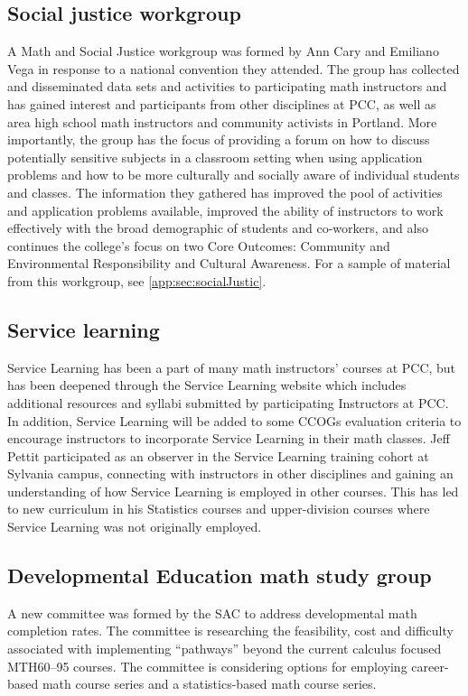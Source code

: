 \subsection{Social justice workgroup}\label{cur:sub:socialJustic}
A Math and Social Justice workgroup was formed by Ann Cary and Emiliano Vega in
response to a national convention they attended. The group has collected and
disseminated data sets and activities to participating math instructors and has
gained interest and participants from other disciplines at PCC, as well as area
high school math instructors and community activists in Portland. More
importantly, the group has the focus of providing a forum on how to discuss
potentially sensitive subjects in a classroom setting when using application
problems and how to be more culturally and socially aware of individual students
and classes. The information they gathered has improved the pool of activities and application problems
available, improved the ability of instructors to work effectively with the
broad demographic of students and co-workers, and also continues the college's
focus on two Core Outcomes: Community and Environmental Responsibility and
Cultural Awareness. For a sample of material from this workgroup, see
\vref{app:sec:socialJustic}.

\subsection{Service learning}\label{other:sec:servicelearning}
Service Learning has been a part of many math instructors' courses at PCC, but
has been deepened through the Service Learning website
which includes additional resources and syllabi submitted
by participating Instructors at PCC. In addition, Service Learning will be
added to some CCOGs evaluation criteria to encourage instructors to incorporate
Service Learning in their math classes. Jeff Pettit participated as
an observer in the Service Learning training cohort at Sylvania campus,
connecting with instructors in other disciplines and gaining an understanding of 
how Service Learning is employed in other courses. This has led to new curriculum in his
Statistics courses and upper-division courses where Service Learning was not
originally employed.

\subsection{Developmental Education math study group}
A new committee was formed by the SAC to address developmental math completion
rates. The committee is researching the feasibility, cost and difficulty
associated with implementing ``pathways'' beyond the current calculus focused
MTH60--95 courses. The committee is considering options for employing
career-based math course series and a statistics-based math course series.

